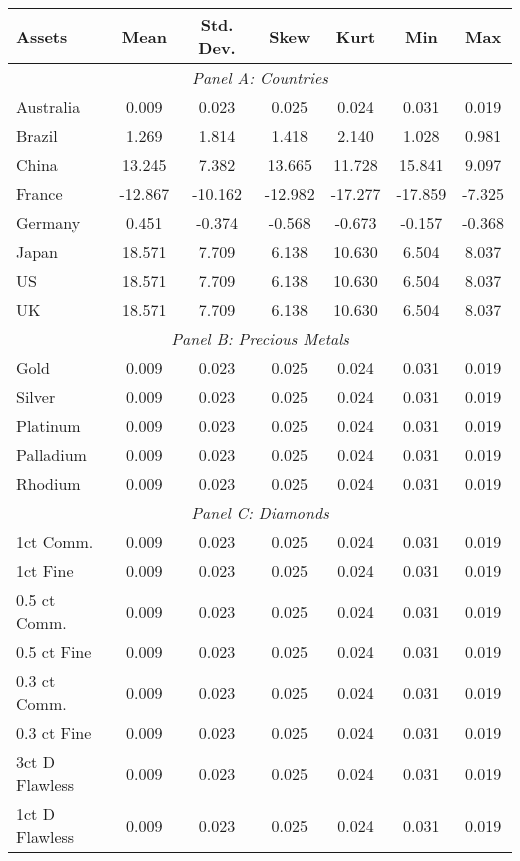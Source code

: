 \begin{tabularx}{1\textwidth}{@{}Xcccccc}
\toprule
Assets & Mean & Std. Dev. & Skew & Kurt & Min & Max \\
\midrule
\multicolumn{7}{c}{\emph{Panel A: Countries}}\\
\addlinespace
Australia 	   &  0.009  & 0.023   &  0.025  &  0.024  & 0.031   & 0.019    \\
Brazil  	   &  1.269  & 1.814   &  1.418  &  2.140  & 1.028   & 0.981    \\
China  	       &  13.245 & 7.382   &  13.665 & 11.728  & 15.841  & 9.097    \\
France  	   & -12.867 & -10.162 & -12.982 & -17.277 & -17.859 & -7.325   \\
Germany 	   & 0.451   & -0.374  & -0.568  & -0.673  & -0.157  & -0.368   \\
Japan 	       & 18.571  & 7.709   & 6.138   & 10.630  & 6.504   & 8.037    \\
US			   & 18.571  & 7.709   & 6.138   & 10.630  & 6.504   & 8.037    \\
UK			   & 18.571  & 7.709   & 6.138   & 10.630  & 6.504   & 8.037    \\
\midrule
\multicolumn{7}{c}{\emph{Panel B: Precious Metals}}\\
\addlinespace
Gold		   &  0.009  & 0.023   &  0.025  &  0.024  & 0.031   & 0.019    \\
Silver		   &  0.009  & 0.023   &  0.025  &  0.024  & 0.031   & 0.019    \\
Platinum	   &  0.009  & 0.023   &  0.025  &  0.024  & 0.031   & 0.019    \\
Palladium	   &  0.009  & 0.023   &  0.025  &  0.024  & 0.031   & 0.019    \\
Rhodium		   &  0.009  & 0.023   &  0.025  &  0.024  & 0.031   & 0.019    \\
\midrule
\multicolumn{7}{c}{\emph{Panel C: Diamonds}}\\
\addlinespace
1ct Comm.	   &  0.009  & 0.023   &  0.025  &  0.024  & 0.031   & 0.019    \\
1ct Fine	   &  0.009  & 0.023   &  0.025  &  0.024  & 0.031   & 0.019    \\
0.5 ct Comm.   &  0.009  & 0.023   &  0.025  &  0.024  & 0.031   & 0.019    \\
0.5 ct Fine    &  0.009  & 0.023   &  0.025  &  0.024  & 0.031   & 0.019    \\
0.3 ct Comm.   &  0.009  & 0.023   &  0.025  &  0.024  & 0.031   & 0.019    \\
0.3 ct Fine	   &  0.009  & 0.023   &  0.025  &  0.024  & 0.031   & 0.019    \\
3ct D Flawless &  0.009  & 0.023   &  0.025  &  0.024  & 0.031   & 0.019    \\
1ct D Flawless &  0.009  & 0.023   &  0.025  &  0.024  & 0.031   & 0.019    \\
\bottomrule
\end{tabularx}
